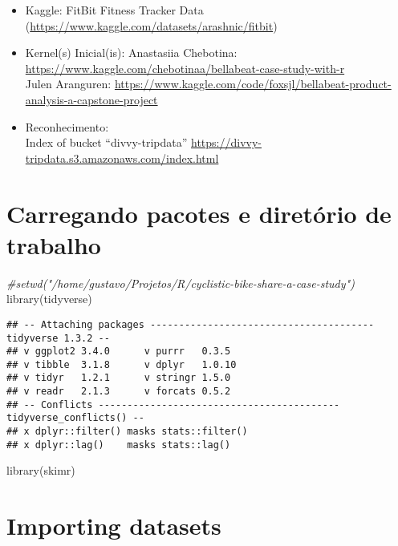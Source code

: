 \documentclass[
]{article}
\newenvironment{Shaded}{\begin{snugshade}}{\end{snugshade}}
\newcommand{\CommentTok}[1]{\textcolor[rgb]{0.56,0.35,0.01}{\textit{#1}}}
\newcommand{\FunctionTok}[1]{\textcolor[rgb]{0.00,0.00,0.00}{#1}}
\newcommand{\NormalTok}[1]{#1}
\begin{document}
\begin{itemize}
\item
  Kaggle: FitBit Fitness Tracker Data
  (\url{https://www.kaggle.com/datasets/arashnic/fitbit})
\item
  Kernel(s) Inicial(is): Anastasiia Chebotina:
  \url{https://www.kaggle.com/chebotinaa/bellabeat-case-study-with-r}\\
  Julen Aranguren:
  \url{https://www.kaggle.com/code/foxsjl/bellabeat-product-analysis-a-capstone-project}\\
\item
  Reconhecimento:\\
  Index of bucket ``divvy-tripdata''
  \url{https://divvy-tripdata.s3.amazonaws.com/index.html}
\end{itemize}

\hypertarget{carregando-pacotes-e-diretuxf3rio-de-trabalho}{%
\section{Carregando pacotes e diretório de
trabalho}\label{carregando-pacotes-e-diretuxf3rio-de-trabalho}}

\begin{Shaded}
\begin{Highlighting}[]
\CommentTok{\#setwd("/home/gustavo/Projetos/R/cyclistic{-}bike{-}share{-}a{-}case{-}study")}
\FunctionTok{library}\NormalTok{(tidyverse)}
\end{Highlighting}
\end{Shaded}

\begin{verbatim}
## -- Attaching packages --------------------------------------- tidyverse 1.3.2 --
## v ggplot2 3.4.0      v purrr   0.3.5 
## v tibble  3.1.8      v dplyr   1.0.10
## v tidyr   1.2.1      v stringr 1.5.0 
## v readr   2.1.3      v forcats 0.5.2 
## -- Conflicts ------------------------------------------ tidyverse_conflicts() --
## x dplyr::filter() masks stats::filter()
## x dplyr::lag()    masks stats::lag()
\end{verbatim}

\begin{Shaded}
\begin{Highlighting}[]
\FunctionTok{library}\NormalTok{(skimr)}
\end{Highlighting}
\end{Shaded}

\hypertarget{importing-datasets}{%
\section{Importing datasets}\label{importing-datasets}}
\end{document}
